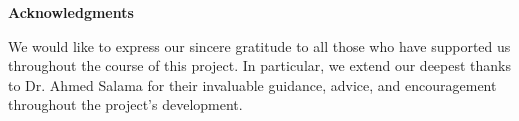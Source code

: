 \begin{center}
    \huge \textbf{Acknowledgments}
\end{center}

\vspace{0.5cm}

\large
We would like to express our sincere gratitude to all those who have supported us throughout the course of this project. In particular, we extend our deepest thanks to Dr. Ahmed Salama for their invaluable guidance, advice, and encouragement throughout the project’s development.